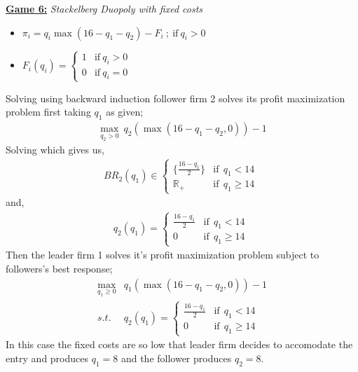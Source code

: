 \documentclass[10pt,leqno]{report}
\begin{document}
\textbf{\underline{Game 6:}} \textit{Stackelberg Duopoly with fixed costs} \\
\begin{tcolorbox}
    \begin{itemize}
        \item \(\pi_{i}=q_{i}\max(16-q_{1}-q_{2})-F_{i}\ ; \ \text{if} \ q_{i}>0\)
        \item \(F_{i}(q_{i})=\begin{cases}
            1 & \text{if} \ q_{i}>0 \\
            0 & \text{if} \ q_{i}=0
        \end{cases}\)
    \end{itemize}
\end{tcolorbox}
Solving using backward induction follower firm 2 solves its profit maximization problem first taking \(q_{1}\) as given;\\
\begin{align*}
    \max_{q_{2}>0} \ q_{2}(\max(16-q_{1}-q_{2},0))-1 
\end{align*}
Solving which gives us, \\
\begin{eqnarray*}
    BR_{2}(q_{1})\in \begin{cases}
        \{\frac{16-q_{1}}{2}\} &  \text{if} \ \ q_{1} < 14\ \\
        \mathbb{R}_{+}  & \text{if} \ \ q_{1}\geq 14
    \end{cases}
\end{eqnarray*}
and, 
\begin{eqnarray*}
    q_{2}(q_{1})=\begin{cases}
        \frac{16-q_{1}}{2} &  \text{if} \ \ q_{1} < 14\ \\
        0  & \text{if} \ \ q_{1}\geq 14
    \end{cases}
\end{eqnarray*}
Then the leader firm 1 solves it's profit maximization problem subject to followers's best response;
\begin{eqnarray*}
    \max_{q_{1}\geq 0} & q_{1}(\max(16-q_{1}-q_{2},0))-1 \\
    s.t. & q_{2}(q_{1})=\begin{cases}
        \frac{16-q_{1}}{2} &  \text{if} \ \ q_{1} < 14 \\
        0  & \text{if} \ \ q_{1}\geq 14
    \end{cases} 
\end{eqnarray*}
In this case the fixed costs are so low that leader firm decides to accomodate the entry and produces \(q_{1}=8\) and the follower produces \(q_{2}=8\). 
\end{document}
